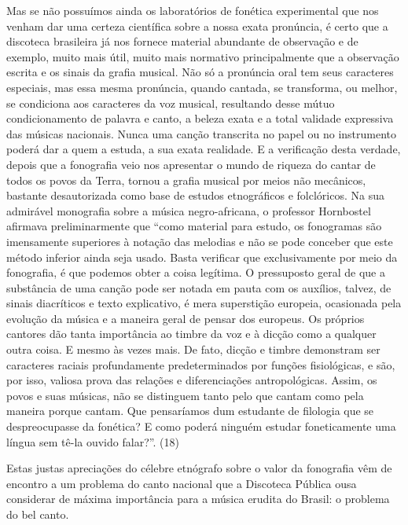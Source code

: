 Mas se não possuímos ainda os laboratórios de fonética experimental que
nos venham dar uma certeza científica sobre a nossa exata pronúncia, é
certo que a discoteca brasileira já nos fornece material abundante de
observação e de exemplo, muito mais útil, muito mais normativo
principalmente que a observação escrita e os sinais da grafia musical.
Não só a pronúncia oral tem seus caracteres especiais, mas essa mesma
pronúncia, quando cantada, se transforma, ou melhor, se condiciona aos
caracteres da voz musical, resultando desse mútuo condicionamento de
palavra e canto, a beleza exata e a total validade expressiva das
músicas nacionais. Nunca uma canção transcrita no papel ou no
instrumento poderá dar a quem a estuda, a sua exata realidade. E a
verificação desta verdade, depois que a fonografia veio nos apresentar o
mundo de riqueza do cantar de todos os povos da Terra, tornou a grafia
musical por meios não mecânicos, bastante desautorizada como base de
estudos etnográficos e folclóricos. Na sua admirável monografia sobre a
música negro-africana, o professor Hornbostel afirmava preliminarmente
que ``como material para estudo, os fonogramas são imensamente
superiores à notação das melodias e não se pode conceber que este método
inferior ainda seja usado. Basta verificar que exclusivamente por meio
da fonografia, é que podemos obter a coisa legítima. O pressuposto geral
de que a substância de uma canção pode ser notada em pauta com os
auxílios, talvez, de sinais diacríticos e texto explicativo, é mera
superstição europeia, ocasionada pela evolução da música e a maneira
geral de pensar dos europeus. Os próprios cantores dão tanta importância
ao timbre da voz e à dicção como a qualquer outra coisa. E mesmo às
vezes mais. De fato, dicção e timbre demonstram ser caracteres raciais
profundamente predeterminados por funções fisiológicas, e são, por isso,
valiosa prova das relações e diferenciações antropológicas. Assim, os
povos e suas músicas, não se distinguem tanto pelo que cantam como pela
maneira porque cantam. Que pensaríamos dum estudante de filologia que se
despreocupasse da fonética? E como poderá ninguém estudar foneticamente
uma língua sem tê-la ouvido falar?''. (18)

Estas justas apreciações do célebre etnógrafo sobre o valor da
fonografia vêm de encontro a um problema do canto nacional que a
Discoteca Pública ousa considerar de máxima importância para a música
erudita do Brasil: o problema do bel canto.

